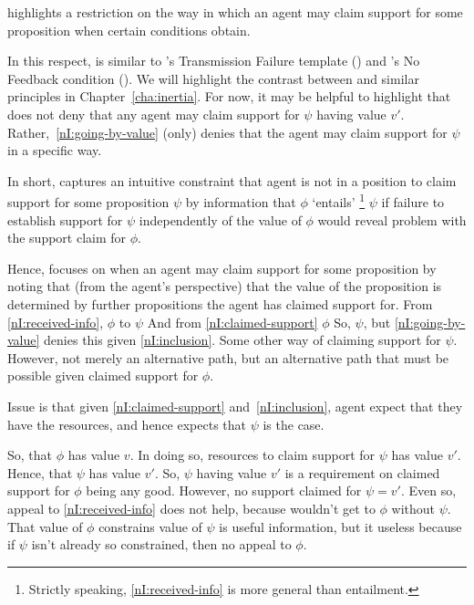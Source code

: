 \begin{note}
  \nI{} highlights a restriction on the way in which an agent may claim support for some proposition when certain conditions obtain.

  In this respect, \nI{} is similar to \citeauthor{Wright:2011wn}'s Transmission Failure template (\citeyear{Wright:2003aa,Wright:2011wn}) and \citeauthor{Weisberg:2010to}'s No Feedback condition (\citeyear{Weisberg:2010to}).
  We will highlight the contrast between \nI{} and similar principles in Chapter~\ref{cha:inertia}.
  For now, it may be helpful to highlight that \nI{} does not deny that any agent may claim support for \(\psi\) having value \(v'\).
  Rather,~\ref{nI:going-by-value} (only) denies that the agent may claim support for \(\psi\) in a specific way.

  In short, \nI{} captures an intuitive constraint that agent is not in a position to claim support for some proposition \(\psi\) by information that \(\phi\) `entails'\nolinebreak
  \footnote{Strictly speaking, \ref{nI:received-info} is more general than entailment.}
  \(\psi\) if failure to establish support for \(\psi\) independently of the value of \(\phi\) would reveal problem with the support claim for \(\phi\).

  Hence, \nI{} focuses on when an agent may claim support for some proposition by noting that (from the agent's perspective) that the value of the proposition is determined by further propositions the agent has claimed support for.
  From \ref{nI:received-info}, \(\phi\) to \(\psi\)
  And from \ref{nI:claimed-support} \(\phi\)
  So, \(\psi\), but \ref{nI:going-by-value} denies this given \ref{nI:inclusion}.
  Some other way of claiming support for \(\psi\).
  However, not merely an alternative path, but an alternative path that must be possible given claimed support for \(\phi\).

  Issue is that given \ref{nI:claimed-support} and~\ref{nI:inclusion}, agent expect that they have the resources, and hence expects that \(\psi\) is the case.

  So, that \(\phi\) has value \(v\).
  In doing so, resources to claim support for \(\psi\) has value \(v'\).
  Hence, that \(\psi\) has value \(v'\).
  So, \(\psi\) having value \(v'\) is a requirement on claimed support for \(\phi\) being any good.
  However, no support claimed for \(\psi = v'\).
  Even so, appeal to \ref{nI:received-info} does not help, because wouldn't get to \(\phi\) without \(\psi\).
  That value of \(\phi\) constrains value of \(\psi\) is useful information, but it useless because if \(\psi\) isn't already so constrained, then no appeal to \(\phi\).


\end{note}
